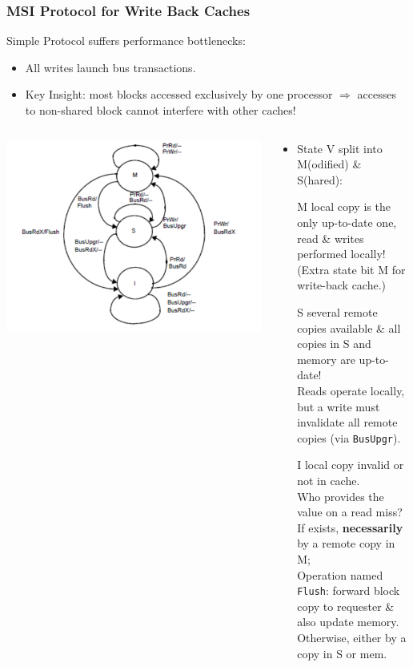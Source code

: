 \documentclass{beamer}
\renewcommand{\emph}[1]{\textcolor{structure}{#1}}
\newcommand{\emp}[1]{\textcolor{DikuRed}{ #1}}
\begin{document}
\begin{frame}[fragile,t]
\frametitle{MSI Protocol for Write Back Caches}

Simple Protocol suffers performance bottlenecks:
\begin{itemize}
    \item \alert{All writes launch bus transactions.}
    \item \emph{Key Insight}: most blocks accessed exclusively
            by one processor $\Rightarrow$ accesses to non-shared 
            block cannot interfere with other caches!
\end{itemize} 


\begin{columns}\hspace{-7ex}
\includegraphics[width=40ex]{FigsInfCoherence/MSI}\pause
{}
\begin{scriptsize}
\begin{itemize}
    \item State V split into M(odified) \& S(hared):\smallskip
    \item[M] local copy is the only up-to-date one,\\
            read \& writes performed locally!\\
            (Extra state bit M for write-back cache.)\smallskip
    \item[S] several remote copies available \& all copies in S and memory are up-to-date!\\
             Reads operate locally, but a write must invalidate 
            all remote copies (via {\tt BusUpgr}).\smallskip
    \item[I] local copy invalid or not in cache.\\
                \emp{Who provides the value on a read miss?}\\
                    \emp{If exists}, {\bf necessarily} by a remote copy in M;\\ 
                    Operation named {\tt Flush}: forward block\\ 
                    copy to requester \& also update memory.\\
                    \emp{Otherwise}, either by a copy in S or mem.
\end{itemize}
\end{scriptsize}
\end{columns}

\end{frame}
\end{document}
